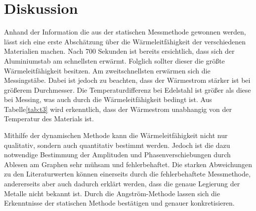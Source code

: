 \section{Diskussion}
\label{sec:Diskussion}
Anhand der Information die aus der statischen Messmethode gewonnen werden, lässt sich eine erste Abschätzung über die Wärmeleitfähigkeit der verschiedenen Materialien machen.
Nach 700 Sekunden ist bereits ersichtlich, dass sich der Aluminiumstab am schnellsten erwärmt.
Folglich sollter dieser die größte Wärmeleitfähigkeit besitzen.
Am zweitschnellsten erwärmen sich die Messingstäbe.
Dabei ist jedoch zu beachten, dass der Wärmestrom stärker ist bei größerem Durchmesser.
Die Temperaturdifferenz bei Edelstahl ist größer als diese bei Messing, was auch durch die Wärmeleitfähigkeit bedingt ist.
Aus Tabelle\ref{tab:t3} wird erkenntlich, dass der Wärmestrom unabhangig von der Temperatur des Materials ist.

Mithilfe der dynamischen Methode kann die Wärmeleitfähigkeit nicht nur qualitativ, sondern auch quantitativ bestimmt werden.
Jedoch ist die dazu notwendige Bestimmung der Amplituden und Phasenverschiebungen durch Ablesen am Graphen sehr mühsam und fehlerbehaftet.
Die starken Abweichungen zu den Literaturwerten können einerseits durch die fehlerbehaftete
Messmethode, andererseits aber auch dadurch erklärt werden, dass die genaue Legierung der
Metalle nicht bekannt ist.
Durch die Angström-Methode lassen sich die Erkenntnisse der statischen Methode bestätigen und genauer konkretisieren.
